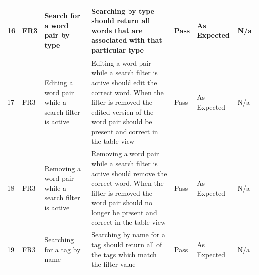 \documentclass[paper=a4, fontsize=11pt]{scrartcl}	%
\numberwithin{equation}{section}															%
\numberwithin{figure}{section}																%
\numberwithin{table}{section}
\begin{document}
\begin{landscape}
\begin{longtable}{|l|p{2cm}|p{5cm}|p{5cm}|l|p{5cm}|p{5cm}|}
16 & FR3                    & Search for a word pair by type                       & Searching by type should return all words that are associated with that particular type                                                                                                                                                    & Pass      & As Expected                                        & N/a                                                                                                                                                                                                                        \\ \hline
17 & FR3                    & Editing a word pair while a search filter is active  & Editing a word pair while a search filter is active should edit the correct word. When the filter is removed the edited version of the word pair should be present and correct in the table view                                           & Pass      & As Expected                                        & N/a                                                                                                                                                                                                                        \\ \hline
18 & FR3                    & Removing a word pair while a search filter is active & Removing a word pair while a search filter is active should remove the correct word. When the filter is removed the word pair should no longer be present and correct in the table view                                                    & Pass      & As Expected                                        & N/a                                                                                                                                                                                                                        \\ \hline
19 & FR3                    & Searching for a tag by name                          & Searching by name for a tag should return all of the tags which match the filter value                                                                                                                                                     & Pass      & As Expected                                        & N/a                                                                                                                                                                                                                        \\ \hline

\end{longtable}
\end{landscape}
\end{document}
